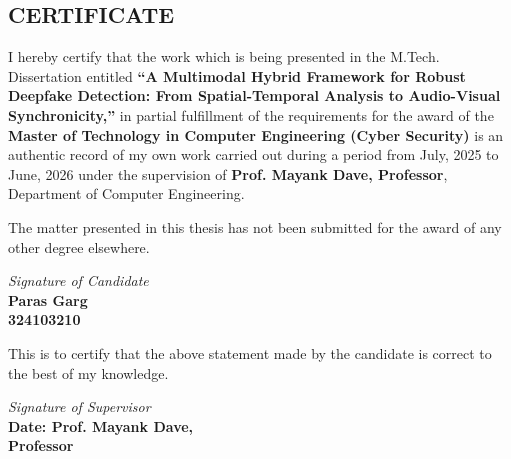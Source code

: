 \begin{center}
	\section*{CERTIFICATE}
	\noindent{\rule{\textwidth}{1.5pt}}
\end{center}
I hereby certify that the work which is being presented in the M.Tech. Dissertation entitled \textbf{``A Multimodal Hybrid Framework for Robust Deepfake Detection: From Spatial-Temporal Analysis to Audio-Visual Synchronicity,''} in partial fulfillment of the requirements for the award of the \textbf{Master of Technology in Computer Engineering (Cyber Security)} is an authentic record of my own work carried out during a period from July, 2025 to June, 2026 under the supervision of \textbf{Prof. Mayank Dave, Professor}, Department of Computer Engineering.
\vspace{30pt}
\par
The matter presented in this thesis has not been submitted for the award of any other degree elsewhere.
\begin{flushright}
	\textit{Signature of Candidate \\}
	\textbf{Paras Garg\\324103210\\}
\end{flushright}
\vspace{30pt}

\par
This is to certify that the above statement made by the candidate is correct to the best of my knowledge.
\vspace{20pt}

\begin{flushright}
	\textit{Signature of Supervisor\\}
	\textbf{Date: \hfill Prof. Mayank Dave,\\ Professor}
\end{flushright}